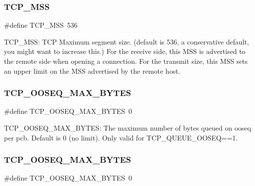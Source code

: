 \subsubsection{\texorpdfstring{T\+C\+P\+\_\+\+M\+SS}{TCP\_MSS}\hspace{0.1cm}{\footnotesize\ttfamily [2/2]}}
{\footnotesize\ttfamily \#define T\+C\+P\+\_\+\+M\+SS~536}

T\+C\+P\+\_\+\+M\+SS\+: T\+CP Maximum segment size. (default is 536, a conservative default, you might want to increase this.) For the receive side, this M\+SS is advertised to the remote side when opening a connection. For the transmit size, this M\+SS sets an upper limit on the M\+SS advertised by the remote host. \mbox{\label{group__lwip__opts__tcp_ga9d6d3219bb5fc0bc760a64114de13c25}} 
\subsubsection{\texorpdfstring{T\+C\+P\+\_\+\+O\+O\+S\+E\+Q\+\_\+\+M\+A\+X\+\_\+\+B\+Y\+T\+ES}{TCP\_OOSEQ\_MAX\_BYTES}\hspace{0.1cm}{\footnotesize\ttfamily [1/2]}}
{\footnotesize\ttfamily \#define T\+C\+P\+\_\+\+O\+O\+S\+E\+Q\+\_\+\+M\+A\+X\+\_\+\+B\+Y\+T\+ES~0}

T\+C\+P\+\_\+\+O\+O\+S\+E\+Q\+\_\+\+M\+A\+X\+\_\+\+B\+Y\+T\+ES\+: The maximum number of bytes queued on ooseq per pcb. Default is 0 (no limit). Only valid for T\+C\+P\+\_\+\+Q\+U\+E\+U\+E\+\_\+\+O\+O\+S\+EQ==1. \mbox{\label{group__lwip__opts__tcp_ga9d6d3219bb5fc0bc760a64114de13c25}} 
\subsubsection{\texorpdfstring{T\+C\+P\+\_\+\+O\+O\+S\+E\+Q\+\_\+\+M\+A\+X\+\_\+\+B\+Y\+T\+ES}{TCP\_OOSEQ\_MAX\_BYTES}\hspace{0.1cm}{\footnotesize\ttfamily [2/2]}}
{\footnotesize\ttfamily \#define T\+C\+P\+\_\+\+O\+O\+S\+E\+Q\+\_\+\+M\+A\+X\+\_\+\+B\+Y\+T\+ES~0}

